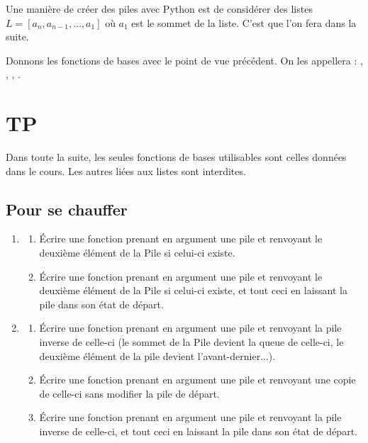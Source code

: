 \documentclass[french,11pt,twoside]{VcCours}
\begin{document}
\medskip

Une manière de créer des piles avec Python est de considérer des listes 
$L=[a_n, a_{n-1}, \ldots, a_1]$ où $a_1$ est le sommet de la liste. 
C'est que l'on fera dans la suite.


\begin{Exemple}%
    Donnons les fonctions de bases avec le point de vue précédent. 
    On les appellera : , , , 
    .
\end{Exemple}


\newpage
\section{TP}
Dans toute la suite, les seules fonctions de bases utilisables sont celles 
données dans le cours. Les autres liées aux listes sont interdites. 

\subsection{Pour se chauffer}
\begin{enumerate}
\item
\begin{enumerate}
\item Écrire une fonction  prenant en argument une pile et 
renvoyant le deuxième élément de la Pile si celui-ci existe.
\item Écrire une fonction  prenant en argument une pile et 
renvoyant le deuxième élément de la Pile si celui-ci existe, et tout ceci en
laissant la pile dans son état de départ.
\end{enumerate}
\item 
\begin{enumerate}
\item Écrire une fonction  prenant en argument une pile et renvoyant 
la pile inverse de celle-ci (le sommet de la Pile devient la queue de celle-ci, 
le deuxième élément de la pile devient l'avant-dernier...).
\item  Écrire une fonction  prenant en argument une pile et 
renvoyant une copie de celle-ci sans modifier la pile de départ.
\item Écrire une fonction  prenant en argument une pile et 
renvoyant la pile inverse de celle-ci, et tout ceci en
laissant la pile dans son état de départ.
\end{enumerate}
\end{enumerate}
\end{document}
